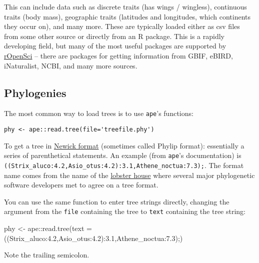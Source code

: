\documentclass[
]{article}
\newenvironment{Shaded}{\begin{snugshade}}{\end{snugshade}}
\newcommand{\AttributeTok}[1]{\textcolor[rgb]{0.77,0.63,0.00}{#1}}
\newcommand{\FunctionTok}[1]{\textcolor[rgb]{0.00,0.00,0.00}{#1}}
\newcommand{\NormalTok}[1]{#1}
\newcommand{\OtherTok}[1]{\textcolor[rgb]{0.56,0.35,0.01}{#1}}
\newcommand{\SpecialCharTok}[1]{\textcolor[rgb]{0.00,0.00,0.00}{#1}}
\newcommand{\StringTok}[1]{\textcolor[rgb]{0.31,0.60,0.02}{#1}}
\begin{document}
This can include data such as discrete traits (has wings / wingless), continuous traits (body mass), geographic traits (latitudes and longitudes, which continents they occur on), and many more. These are typically loaded either as csv files from some other source or directly from an R package. This is a rapidly developing field, but many of the most useful packages are supported by \href{https://ropensci.org/packages/}{rOpenSci} -- there are packages for getting information from GBIF, eBIRD, iNaturalist, NCBI, and many more sources.

\hypertarget{phylogenies}{%
\subsection{Phylogenies}\label{phylogenies}}

The most common way to load trees is to use \texttt{ape}'s functions:

\begin{verbatim}
phy <- ape::read.tree(file='treefile.phy')
\end{verbatim}

To get a tree in \href{http://evolution.genetics.washington.edu/phylip/newicktree.html}{Newick format} (sometimes called Phylip format): essentially a series of parenthetical statements. An example (from \texttt{ape}'s documentation) is \texttt{((Strix\_aluco:4.2,Asio\_otus:4.2):3.1,Athene\_noctua:7.3);}. The format name comes from the name of the \href{http://newicks.com}{lobster house} where several major phylogenetic software developers met to agree on a tree format.

You can use the same function to enter tree strings directly, changing the argument from the \texttt{file} containing the tree to \texttt{text} containing the tree string:

\begin{Shaded}
\begin{Highlighting}[]
\NormalTok{phy }\OtherTok{\textless{}{-}}\NormalTok{ ape}\SpecialCharTok{::}\FunctionTok{read.tree}\NormalTok{(}\AttributeTok{text =} \StringTok{\textquotesingle{}((Strix\_aluco:4.2,Asio\_otus:4.2):3.1,Athene\_noctua:7.3);\textquotesingle{}}\NormalTok{)}
\end{Highlighting}
\end{Shaded}

Note the trailing semicolon.
\end{document}
